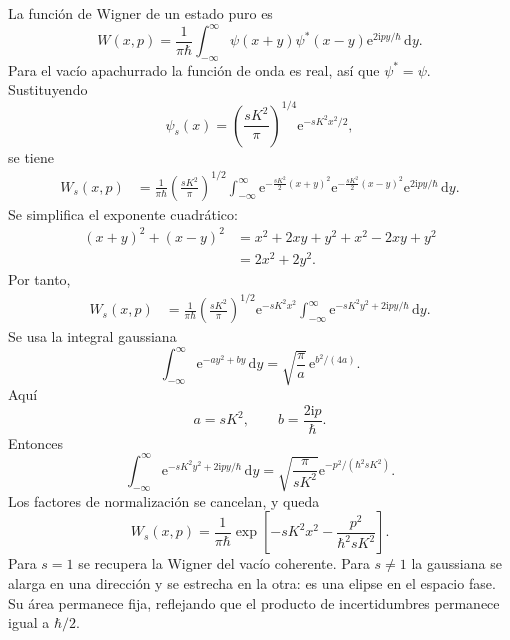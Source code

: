 \documentclass[11pt]{article}
\newcommand{\ii}{\mathrm{i}}
\newcommand{\ee}{\mathrm{e}}
\newcommand{\dd}{\mathrm{d}}
\begin{document}
La funci\'on de Wigner de un estado puro es
\begin{equation}
  W(x,p)
  =
  \frac{1}{\pi\hbar}
  \int_{-\infty}^{\infty}
  \psi(x+y)\psi^*(x-y)
  \ee^{2\ii py/\hbar}\,\dd y.
\end{equation}
Para el vac\'io apachurrado la funci\'on de onda es real, as\'i que
$\psi^*=\psi$. Sustituyendo
\begin{equation}
  \psi_s(x)
  =
  \left(\frac{sK^2}{\pi}\right)^{1/4}
  \ee^{-sK^2x^2/2},
\end{equation}
se tiene
\begin{align}
  W_s(x,p)
  &=
  \frac{1}{\pi\hbar}
  \left(\frac{sK^2}{\pi}\right)^{1/2}
  \int_{-\infty}^{\infty}
  \ee^{-\frac{sK^2}{2}(x+y)^2}
  \ee^{-\frac{sK^2}{2}(x-y)^2}
  \ee^{2\ii py/\hbar}\,\dd y.
\end{align}
Se simplifica el exponente cuadr\'atico:
\begin{align}
  (x+y)^2+(x-y)^2
  &=
  x^2+2xy+y^2+x^2-2xy+y^2\\
  &=
  2x^2+2y^2.
\end{align}
Por tanto,
\begin{align}
  W_s(x,p)
  &=
  \frac{1}{\pi\hbar}
  \left(\frac{sK^2}{\pi}\right)^{1/2}
  \ee^{-sK^2x^2}
  \int_{-\infty}^{\infty}
  \ee^{-sK^2y^2+2\ii py/\hbar}\,\dd y.
\end{align}
Se usa la integral gaussiana
\begin{equation}
  \int_{-\infty}^{\infty}\ee^{-ay^2+by}\,\dd y
  =
  \sqrt{\frac{\pi}{a}}\,
  \ee^{b^2/(4a)}.
\end{equation}
Aqu\'i
\begin{equation}
  a=sK^2,
  \qquad
  b=\frac{2\ii p}{\hbar}.
\end{equation}
Entonces
\begin{equation}
  \int_{-\infty}^{\infty}
  \ee^{-sK^2y^2+2\ii py/\hbar}\,\dd y
  =
  \sqrt{\frac{\pi}{sK^2}}
  \ee^{-p^2/(\hbar^2sK^2)}.
\end{equation}
Los factores de normalizaci\'on se cancelan, y queda
\begin{equation}
  \boxed{
  W_s(x,p)
  =
  \frac{1}{\pi\hbar}
  \exp\left[
  -sK^2x^2-\frac{p^2}{\hbar^2sK^2}
  \right].
  }
\end{equation}
Para $s=1$ se recupera la Wigner del vac\'io coherente. Para $s\neq1$ la
gaussiana se alarga en una direcci\'on y se estrecha en la otra: es una elipse
en el espacio fase. Su \'area permanece fija, reflejando que el producto de
incertidumbres permanece igual a $\hbar/2$.
\end{document}
